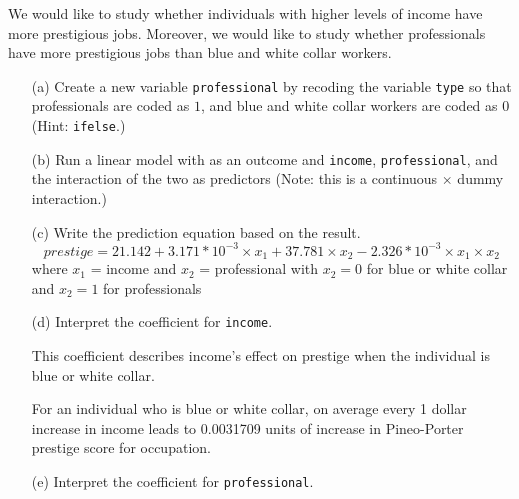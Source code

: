 \documentclass[12pt,letterpaper]{article}
\begin{document}
\noindent We would like to study whether individuals with higher levels of income have more prestigious jobs. Moreover, we would like to study whether professionals have more prestigious jobs than blue and white collar workers.

\newpage
\begin{enumerate}
	
	\item [(a)]
	Create a new variable \texttt{professional} by recoding the variable \texttt{type} so that professionals are coded as $1$, and blue and white collar workers are coded as $0$ (Hint: \texttt{ifelse}.)
	
	  
	
	\vspace{.6cm}
	
	
	\item [(b)]
	Run a linear model with  as an outcome and \texttt{income}, \texttt{professional}, and the interaction of the two as predictors (Note: this is a continuous $\times$ dummy interaction.)
	
	 
	
	\vspace{.6cm}
	\item [(c)]
	Write the prediction equation based on the result.
	\begin{equation*}
	prestige = 21.142 + 3.171 * 10^{-3} \times  x_1 + 37.781 \times x_2 - 2.326 * 10^{-3} \times x_1 \times x_2
	\end{equation*}
	where $x_1$ = income
	and $x_2$ = professional with $x_2 = 0$ for blue or white collar and $x_2=1$ for professionals
	
\newpage
	\item [(d)]
	Interpret the coefficient for \texttt{income}. 
	
	\vspace{1cm}
		
	This coefficient describes income's effect on prestige when the individual is blue or white collar.
	
	For an individual who is blue or white collar, on average every 1 dollar increase in income leads to 0.0031709 units of increase in Pineo-Porter prestige score for occupation.
	
	
	\vspace{1cm}	
	\item [(e)]
	Interpret the coefficient for \texttt{professional}.
	

\end{enumerate}
\end{document}
